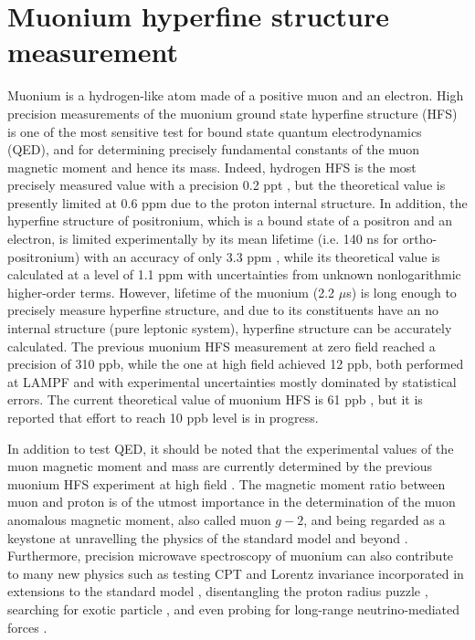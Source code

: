 \section{Muonium hyperfine structure measurement}

Muonium is a hydrogen-like atom made of a positive muon and
an electron.  High precision measurements of the muonium ground
state hyperfine structure (HFS) is one of the most sensitive
test for bound state quantum electrodynamics (QED), and for
determining precisely fundamental constants of the muon magnetic
moment and hence its mass.  Indeed, hydrogen HFS is the most
precisely measured value with a precision 0.2 ppt \cite{Essen-1973},
but the theoretical value is presently limited at
0.6 ppm \cite{Eides:1012805} due to the proton internal structure.
In addition, the hyperfine structure of positronium, which
is a bound state of a positron and an electron, is limited
experimentally by its mean lifetime (i.e. 140 ns for
ortho-positronium) with an accuracy of only
3.3 ppm \cite{Ritter-etal, Mills, Ishida-etal-PLB734-338-2014},
while its theoretical value is calculated at
a level of 1.1 ppm \cite{Baker-etal-PRL.112.120407} with
uncertainties from unknown nonlogarithmic
higher-order terms.  However, lifetime of the muonium (2.2 $\mu$s)
is long enough to precisely measure hyperfine structure, and
due to its constituents have an no internal structure (pure
leptonic system), hyperfine structure can be accurately calculated.
The previous muonium HFS measurement at zero field \cite{Casperson-etal}
reached a precision of 310 ppb, while the one at high 
field \cite{Liu:1999iz} achieved
12 ppb, both performed at LAMPF and with experimental uncertainties
mostly dominated by statistical errors.  The current theoretical
value of muonium HFS is 61 ppb \cite{CODATA}, but it is reported
that effort to reach 10 ppb level is in progress.

In addition to test QED, it should be noted that the experimental
values of the muon magnetic moment and mass are currently determined
by the previous muonium HFS experiment at high
field \cite{Liu:1999iz}.  The
magnetic moment ratio between muon and proton is of the utmost
importance in the determination of the muon anomalous magnetic
moment, also called muon $g-2$, and being regarded as a keystone
at unravelling the physics of the standard model and 
beyond \cite{Otani-JPARCSympo-2015}.
Furthermore, precision microwave spectroscopy of muonium can
also contribute to many new physics such as testing CPT and
Lorentz invariance incorporated in extensions to the standard
model \cite{Hughes-etal-inBook, KosteleckyVargas-PRD92.056002},
disentangling the proton radius puzzle \cite{Pohl-etal-nature,
Brodsky-etal-PRL94.022001},
searching for exotic particle \cite{Karshenboim-PRL104.220406,
KarshenboimFlambaum-PRA84-2011}, and even probing for
long-range neutrino-mediated forces \cite{Stadnik}.

